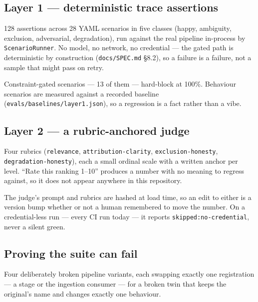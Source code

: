 \documentclass[11pt,a4paper]{article}
\begin{document}
\subsection{Layer 1 --- deterministic trace assertions}

128 assertions across 28 YAML scenarios in five classes (happy, ambiguity,
exclusion, adversarial, degradation), run against the real pipeline in-process
by \texttt{ScenarioRunner}. No model, no network, no credential --- the gated
path is deterministic by construction (\texttt{docs/SPEC.md} \S8.2), so a
failure is a failure, not a sample that might pass on retry.

Constraint-gated scenarios --- 13 of them --- hard-block at 100\%. Behaviour
scenarios are measured against a recorded baseline
(\texttt{evals/baselines/layer1.json}), so a regression is a fact rather than
a vibe.

\subsection{Layer 2 --- a rubric-anchored judge}

Four rubrics (\texttt{relevance}, \texttt{attribution-clarity},
\texttt{exclusion-honesty}, \texttt{degradation-honesty}), each a small
ordinal scale with a written anchor per level. ``Rate this ranking 1--10''
produces a number with no meaning to regress against, so it does not appear
anywhere in this repository.

The judge's prompt and rubrics are hashed at load time, so an edit to either
is a version bump whether or not a human remembered to move the number. On a
credential-less run --- every CI run today --- it reports
\texttt{skipped:no-credential}, never a silent green.

\subsection{Proving the suite can fail}

Four deliberately broken pipeline variants, each swapping exactly one
registration --- a stage or the ingestion consumer --- for a broken twin that
keeps the original's name and changes exactly one behaviour.
\end{document}
